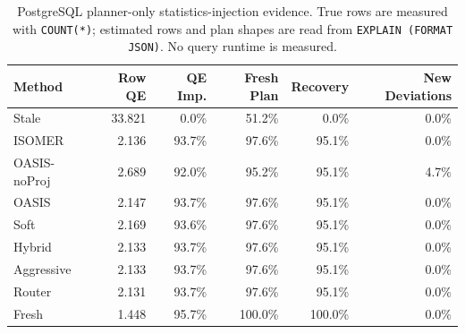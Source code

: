 \begin{table}[t]
  \centering
  \small
  \caption{PostgreSQL planner-only statistics-injection evidence. True rows are measured with \texttt{COUNT(*)}; estimated rows and plan shapes are read from \texttt{EXPLAIN (FORMAT JSON)}. No query runtime is measured.}
  \label{tab:postgres_planner_stats_injection}
  \setlength{\tabcolsep}{4pt}
  \begin{tabular}{lrrrrr}
    \toprule
    Method & Row QE & QE Imp. & Fresh Plan & Recovery & New Deviations \\
    \midrule
    Stale & 33.821 & 0.0\% & 51.2\% & 0.0\% & 0.0\% \\
    ISOMER & 2.136 & 93.7\% & 97.6\% & 95.1\% & 0.0\% \\
    OASIS-noProj & 2.689 & 92.0\% & 95.2\% & 95.1\% & 4.7\% \\
    OASIS & 2.147 & 93.7\% & 97.6\% & 95.1\% & 0.0\% \\
    Soft & 2.169 & 93.6\% & 97.6\% & 95.1\% & 0.0\% \\
    Hybrid & 2.133 & 93.7\% & 97.6\% & 95.1\% & 0.0\% \\
    Aggressive & 2.133 & 93.7\% & 97.6\% & 95.1\% & 0.0\% \\
    Router & 2.131 & 93.7\% & 97.6\% & 95.1\% & 0.0\% \\
    Fresh & 1.448 & 95.7\% & 100.0\% & 100.0\% & 0.0\% \\
    \bottomrule
  \end{tabular}
\end{table}
